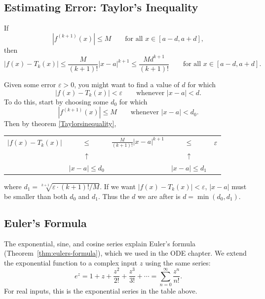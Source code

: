 \subsection{Estimating Error: Taylor's Inequality}

\begin{thm}
\label{Taylorsinequality}
If 
$$\left|f^{(k+1)}(x)\right|\leq M\quad\quad\text{for all }x\in [a-d,a+d],$$
then
$$|f(x)-T_k(x)|\leq \frac{M}{(k+1)!}|x-a|^{k+1}\leq \frac{Md^{k+1}}{(k+1)!} \quad\quad\text{for all }x\in [a-d,a+d].$$
\end{thm}

Given some error $\varepsilon>0$, you might want to find a value of $d$ for which 
$$|f(x)-T_k(x)|<\varepsilon\quad\quad\text{whenever } |x-a|<d.$$
To do this, start by choosing some $d_0$ for which 
$$\left|f^{(k+1)}(x)\right| \leq M\quad\quad\text{whenever } |x-a|<d_0.$$
Then by theorem \ref{Taylorsinequality},
\begin{center}
\begin{tabular}{ccccc}
$|f(x)-T_k(x)|$ & $\leq$               & $\displaystyle\frac{M}{(k+1)!}|x-a|^{k+1}$  & $\leq$         & $\varepsilon$ \\
                       & $\uparrow$       &                         					    & $\uparrow$ & \\
                       & $|x-a|\leq d_0$ &     							            & $|x-a|\leq d_1$ \\
\end{tabular}
\end{center}
where $d_1=\sqrt[k+1]{\varepsilon\cdot (k+1)!/M}$.  If we want $|f(x)-T_k(x)|<\varepsilon$, $|x-a|$ must be smaller than both $d_0$ and $d_1$. Thus the $d$ we are after is $d=\min\left(d_0, d_1\right)$.

\subsection{Euler's Formula}
\label{sec:euler-formula-series}

The exponential, sine, and cosine series explain Euler's formula
(Theorem~\ref{thm:eulers-formula}), which we used in the ODE chapter.
We extend the exponential function to a complex input $z$ using the
same series:
$$e^z=1+z+\frac{z^2}{2!}+\frac{z^3}{3!}+\cdots
=\sum_{n=0}^{\infty}\frac{z^n}{n!}.$$
For real inputs, this is the exponential series in the table above.

